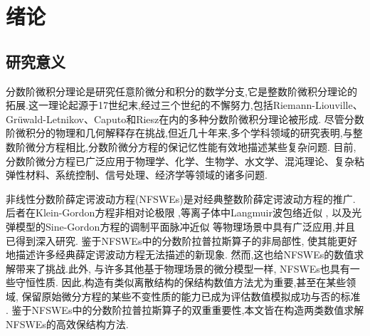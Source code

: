 \chapter[绪论]{绪论}

\section{研究意义}

分数阶微积分理论是研究任意阶微分和积分的数学分支,它是整数阶微积分理论的拓展.这一理论起源于17世纪末,经过三个世纪的不懈努力,包括Riemann-Liouville、Grüwald-Letnikov、Caputo和Riesz在内的多种分数阶微积分理论被形成\cite{samkoFractionalIntegralsDerivatives1993}.
尽管分数阶微积分的物理和几何解释存在挑战,但近几十年来,多个学科领域的研究表明,与整数阶微分方程相比,分数阶微分方程的保记忆性能有效地描述某些复杂问题.
目前,分数阶微分方程已广泛应用于物理学、化学、生物学、水文学、混沌理论、复杂粘弹性材料、系统控制、信号处理、经济学等领域的诸多问题\cite{liIntroductionFractionalCalculus2015,HandbookDifferentialEquations2008,brychkovIndefiniteIntegrals2008,zhangMassBalanceBased2005,carrerasAnomalousDiffusionExit2001,maginSolvingFractionalOrder2009,zaslavskySelfsimilarTransportIncomplete1993,sunRandomorderFractionalDifferential2011}.%

非线性分数阶薛定谔波动方程(NFSWEs)是对经典整数阶薛定谔波动方程的推广.
后者在Klein-Gordon方程非相对论极限 \cite{tsutsumiNonrelativisticApproximationNonlinear1984,machiharaNonrelativisticLimitEnergy2002},等离子体中Langmuir波包络近似 \cite{colinSemidiscretizationTimeNonlinear1998},
以及光弹模型的Sine-Gordon方程的调制平面脉冲近似 \cite{baoComparisonsSineGordonPerturbed2010,xinModelingLightBullets2000}等物理场景中具有广泛应用,并且已得到深入研究\cite{zhangConservativeNumericalScheme2003,baoUniformErrorEstimates2012,chengSeveralConservativeCompact2018,brugnanoClassEnergyconservingHamiltonian2018}.
鉴于NFSWEs中的分数阶拉普拉斯算子的非局部性, 使其能更好地描述许多经典薛定谔波动方程无法描述的新现象.
然而,这也给NFSWEs的数值求解带来了挑战.此外, 与许多其他基于物理场景的微分模型一样, NFSWEs也具有一些守恒性质. 
因此,构造有类似离散结构的保结构数值方法尤为重要,甚至在某些领域, 保留原始微分方程的某些不变性质的能力已成为评估数值模拟成功与否的标准 \cite{liFiniteDifferenceCalculus1995}.
鉴于NFSWEs中的分数阶拉普拉斯算子的双重重要性,本文皆在构造两类数值求解NFSWEs的高效保结构方法.

